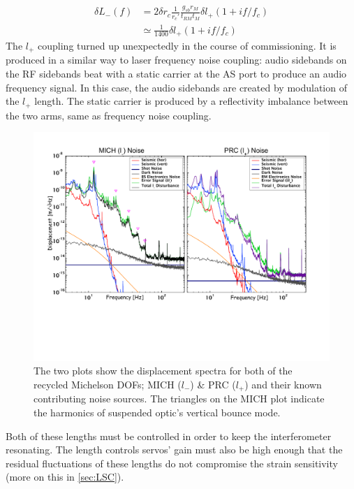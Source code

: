 \begin{equation}
 \begin{split}
  \delta L_{-}(f) &= 2 \delta r_{c} \frac{1}{r_{c}'} 
                     \frac{g_{sb} r_{M}}{t_{RM} t_{M}}
                     \delta l_{+} (1 + i f / f_c) \\
           &\simeq \frac{1}{1400} \delta l_{+} (1 + i f / f_c)
 \end{split}
 \label{eq:prc2darm}
\end{equation}
The $l_{+}$ coupling turned up unexpectedly in the course of 
commissioning. It is produced in a similar way to laser 
frequency noise coupling: audio sidebands on the RF sidebands beat with a 
static carrier at the AS port to produce an audio frequency signal. 
In this case, the audio sidebands are created by modulation of 
the $l_{+}$ length. The static carrier is produced by a reflectivity
imbalance between the two arms, same as frequency noise coupling.

\begin{figure}[!h]
\centerline{
\includegraphics[angle=0,width=6.5in]{Figures/Chap4/POBnoise.pdf}}
\caption[POB Noises]{The two plots show the displacement
         spectra for both of the recycled Michelson DOFs; MICH ($l_-$) 
         \& PRC ($l_+$) and their known contributing noise sources.
         The triangles on the MICH plot indicate the harmonics of
         suspended optic's vertical bounce mode.}
\label{fig:POBnoise}
\end{figure}

Both of these lengths must be controlled in order to keep the interferometer
resonating. The length controls servos' gain must also be high enough
that the residual fluctuations of these lengths do not compromise the
strain sensitivity (more on this in \ref{sec:LSC}).

